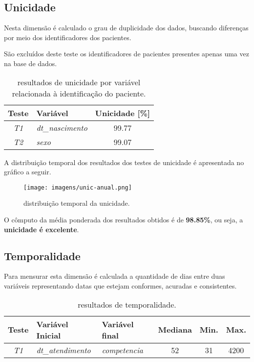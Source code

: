 \documentclass[
  12,
  table]{proadi}
\begin{document}
\hypertarget{unicidade}{%
\subsection{Unicidade}\label{unicidade}}

\label{sub:unicidade}

Nesta dimensão é calculado o grau de duplicidade dos dados, buscando
diferenças por meio dos identificadores dos pacientes.

São excluídos deste teste os identificadores de pacientes presentes
apenas uma vez na base de dados.

\begin{table}[H]

\caption{\label{tab:unnamed-chunk-18}resultados de unicidade por variável relacionada à identificação do paciente.}
\centering
\fontsize{10}{12}\selectfont
\begin{tabular}[t]{>{}c>{}lc}
\toprule
Teste & Variável & Unicidade [\%]\\
\midrule
\em{T1} & \em{dt\_nascimento} & 99.77\\
\em{T2} & \em{sexo} & 99.07\\
\bottomrule
\end{tabular}
\end{table}

A distribuição temporal dos resultados dos testes de unicidade é
apresentada no gráfico a seguir.

\begin{figure}
\centering
\texttt{[image: imagens/unic-anual.png]}
\caption{distribuição temporal da unicidade.}
\end{figure}

O cômputo da média ponderada dos resultados obtidos é de
\textbf{98.85\%}, ou seja, a \textbf{unicidade é excelente}.

\hypertarget{temporalidade}{%
\subsection{Temporalidade}\label{temporalidade}}

Para mensurar esta dimensão é calculada a quantidade de dias entre duas
variáveis representando datas que estejam conformes, acuradas e
consistentes.

\begin{table}[H]

\caption{\label{tab:unnamed-chunk-19}resultados de temporalidade.}
\centering
\fontsize{10}{12}\selectfont
\begin{tabular}[t]{>{}c>{}l>{}lccc}
\toprule
Teste & Variável Inicial & Variável final & Mediana & Min. & Max.\\
\midrule
\em{T1} & \em{dt\_atendimento} & \em{competencia} & 52 & 31 & 4200\\
\bottomrule
\end{tabular}
\end{table}
\end{document}
